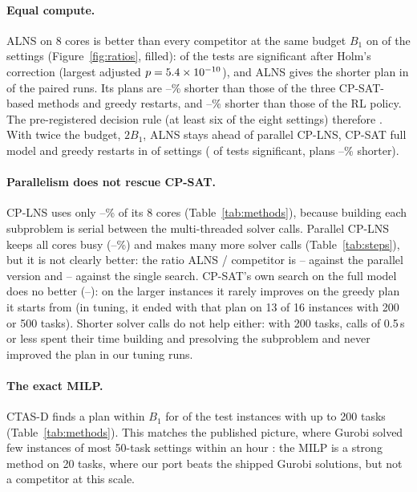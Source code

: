 \paragraph{Equal compute.} ALNS on 8 cores is better than every competitor at the same budget $B_1$ on
\ConeBheld{} of the \ConeBsettings{} settings (Figure~\ref{fig:ratios}, filled): \ConeBsig{} of the \ConeBtests{} tests are
significant after Holm's correction (largest adjusted $p = 5.4 \times 10^{-10}$), and ALNS gives the shorter plan in
\ConeBwon{} of the \ConeBpairs{} paired runs. Its plans are \ConeBclasslo--\ConeBclasshi\% shorter than those of the
three CP-SAT-based methods and greedy restarts, and \ConeBrlgainlo--\ConeBrlgainhi\% shorter than those of the RL
policy.
The pre-registered decision rule (at least six of the eight settings) therefore \ConeBverdict. With twice the budget, $2B_1$, ALNS stays ahead of parallel CP-LNS, CP-SAT full
model and greedy restarts in \ConeBBheld{} of \ConeBBsettings{} settings (\ConeBBsig{} of \ConeBBtests{} tests
significant, plans \ConeBBclasslo--\ConeBBclasshi\% shorter).



\paragraph{Parallelism does not rescue CP-SAT.} CP-LNS uses only \Cpucpsatlo--\Cpucpsathi\% of its 8 cores
(Table~\ref{tab:methods}), because building each subproblem is serial between the multi-threaded solver calls.
Parallel CP-LNS keeps all cores busy (\Cpupcpsatlo--\Cpupcpsathi\%) and makes many more solver calls
(Table~\ref{tab:steps}), but it is not clearly better: the ratio ALNS / competitor is \ConeBpcpsatlo--\ConeBpcpsathi{}
against the parallel version and \ConeBcpsatlo--\ConeBcpsathi{} against the single search. CP-SAT's own search on the
full model does no better (\ConeBcpfulllo--\ConeBcpfullhi): on the larger instances it rarely improves on the greedy
plan it starts from (in tuning, it ended with that plan on 13 of 16 instances with 200 or 500 tasks). Shorter solver
calls do not help either: with 200 tasks, calls of 0.5\,s or less spent their time building and presolving the
subproblem and never improved the plan in our tuning runs.

\paragraph{The exact MILP.} CTAS-D finds a plan within $B_1$ for \CtasSolved{} of the \CtasRuns{} test instances with
up to 200 tasks (Table~\ref{tab:methods}). This matches the published picture, where Gurobi solved few instances of most
50-task settings within an hour \cite{dai2025heterogeneous}: the MILP is a strong method on 20 tasks, where our port
beats the shipped Gurobi solutions, but not a competitor at this scale.

